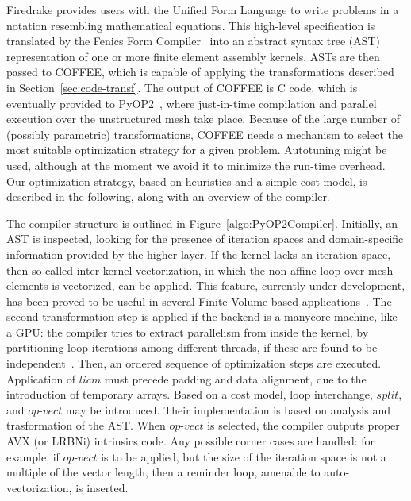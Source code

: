 \documentclass[conference]{IEEEtran}
\begin{document}

Firedrake provides users with the Unified Form Language to write problems in a notation resembling mathematical equations. This high-level specification is translated by the Fenics Form Compiler~\cite{FFC-Compiler} into an abstract syntax tree (AST) representation of one or more finite element assembly kernels. ASTs are then passed to COFFEE, which is capable of applying the transformations described in Section~\ref{sec:code-transf}. The output of COFFEE is C code, which is eventually provided to PyOP2~\cite{pyop2isc}, where just-in-time compilation and parallel execution over the unstructured mesh take place. Because of the large number of (possibly parametric) transformations, COFFEE needs a mechanism to select the most suitable optimization strategy for a given problem. Autotuning might be used, although at the moment we avoid it to minimize the run-time overhead. Our optimization strategy, based on heuristics and a simple cost model, is described in the following, along with an overview of the compiler.

The compiler structure is outlined in Figure~\ref{algo:PyOP2Compiler}. Initially, an AST is inspected, looking for the presence of iteration spaces and domain-specific information provided by the higher layer. If the kernel lacks an iteration space, then so-called inter-kernel vectorization, in which the non-affine loop over mesh elements is vectorized, can be applied. This feature, currently under development, has been proved to be useful in several Finite-Volume-based applications~\cite{inter-kernel-vect}. The second transformation step is applied if the backend is a manycore machine, like a GPU: the compiler tries to extract parallelism from inside the kernel, by partitioning loop iterations among different threads, if these are found to be independent~\cite{pyop2isc}. Then, an ordered sequence of optimization steps are executed. Application of $licm$ must precede padding and data alignment, due to the introduction of temporary arrays. Based on a cost model, loop interchange, $split$, and $op$-$vect$ may be introduced. Their implementation is based on analysis and trasformation of the AST. When $op$-$vect$ is selected, the compiler outputs proper AVX (or LRBNi) intrinsics code. Any possible corner cases are handled: for example, if $op$-$vect$ is to be applied, but the size of the iteration space is not a multiple of the vector length, then a reminder loop, amenable to auto-vectorization, is inserted. 
\end{document}
